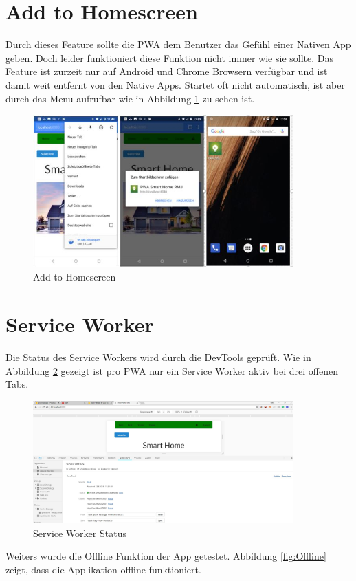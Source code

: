\section{Add to Homescreen}
Durch dieses Feature sollte die \acs{PWA} dem Benutzer das Gefühl einer Nativen App geben. Doch leider funktioniert diese Funktion nicht immer wie sie sollte.
Das Feature ist zurzeit nur auf Android und Chrome Browsern verfügbar und ist damit weit entfernt von den Native Apps. Startet oft nicht automatisch, ist aber durch das Menu aufrufbar wie in Abbildung \ref{fig:ADDHome} zu sehen ist.

\begin{figure}[h]
	\centering
	\includegraphics[width=10cm]{BilderAllgemein/Test/ADDHome}\medskip
	\caption{Add to Homescreen}
	\label{fig:ADDHome}
\end{figure}
\newpage

\section{Service Worker}
Die Status des Service Workers wird durch die DevTools geprüft.
Wie in Abbildung \ref{fig:SWTest} gezeigt ist pro \acs{PWA} nur ein Service Worker aktiv bei drei offenen Tabs. 

\begin{figure}[h]
	\centering
	\includegraphics[width=10cm]{BilderAllgemein/Test/SW}\medskip
	\caption{Service Worker Status}
	\label{fig:SWTest}
\end{figure}
Weiters wurde die Offline Funktion der App getestet.
Abbildung \ref{fig:Offline} zeigt, dass die Applikation offline funktioniert.


